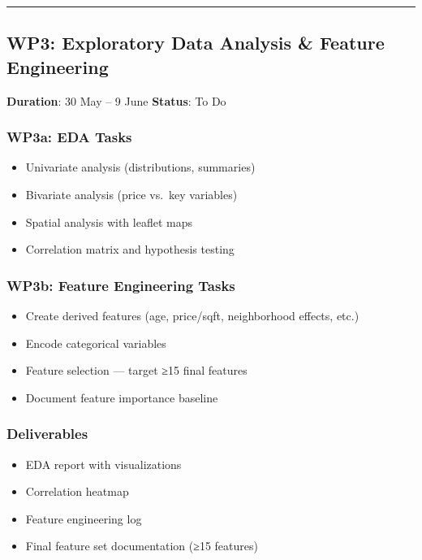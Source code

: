 \documentclass[
  english,
  letterpaper,
  DIV=11,
  numbers=noendperiod]{scrreprt}
\providecommand{\tightlist}{%
  \setlength{\itemsep}{0pt}\setlength{\parskip}{0pt}}
\begin{document}
\begin{center}\rule{0.5\linewidth}{0.5pt}\end{center}

\subsection{WP3: Exploratory Data Analysis \& Feature
Engineering}\label{wp3-exploratory-data-analysis-feature-engineering}

\textbf{Duration}: 30 May -- 9 June \textbar{} \textbf{Status}: To Do

\subsubsection{WP3a: EDA Tasks}\label{wp3a-eda-tasks}

\begin{itemize}
\tightlist
\item
  Univariate analysis (distributions, summaries)
\item
  Bivariate analysis (price vs.~key variables)
\item
  Spatial analysis with leaflet maps
\item
  Correlation matrix and hypothesis testing
\end{itemize}

\subsubsection{WP3b: Feature Engineering
Tasks}\label{wp3b-feature-engineering-tasks}

\begin{itemize}
\tightlist
\item
  Create derived features (age, price/sqft, neighborhood effects, etc.)
\item
  Encode categorical variables
\item
  Feature selection --- target ≥15 final features
\item
  Document feature importance baseline
\end{itemize}

\subsubsection{Deliverables}\label{deliverables-3}

\begin{itemize}
\tightlist
\item
  EDA report with visualizations
\item
  Correlation heatmap
\item
  Feature engineering log
\item
  Final feature set documentation (≥15 features)
\end{itemize}
\end{document}
